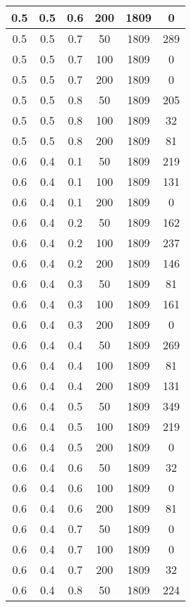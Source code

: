 \begin{center}
\begin{longtable}[c]{|c|c|c|c|c|c|}
		0.5 &  0.5 &  0.6 &  200 &  1809 &     0 \\
	   \hline
		0.5 &  0.5 &  0.7 &   50 &  1809 &   289 \\
		0.5 &  0.5 &  0.7 &  100 &  1809 &     0 \\
		0.5 &  0.5 &  0.7 &  200 &  1809 &     0 \\
	   \hline
		0.5 &  0.5 &  0.8 &   50 &  1809 &   205 \\
		0.5 &  0.5 &  0.8 &  100 &  1809 &    32 \\
		0.5 &  0.5 &  0.8 &  200 &  1809 &    81 \\
	   \hline
		0.6 &  0.4 &  0.1 &   50 &  1809 &   219 \\
		0.6 &  0.4 &  0.1 &  100 &  1809 &   131 \\
		0.6 &  0.4 &  0.1 &  200 &  1809 &     0 \\
	   \hline
		0.6 &  0.4 &  0.2 &   50 &  1809 &   162 \\
		0.6 &  0.4 &  0.2 &  100 &  1809 &   237 \\
		0.6 &  0.4 &  0.2 &  200 &  1809 &   146 \\
	   \hline
		0.6 &  0.4 &  0.3 &   50 &  1809 &    81 \\
		0.6 &  0.4 &  0.3 &  100 &  1809 &   161 \\
		0.6 &  0.4 &  0.3 &  200 &  1809 &     0 \\
	   \hline
		0.6 &  0.4 &  0.4 &   50 &  1809 &   269 \\
		0.6 &  0.4 &  0.4 &  100 &  1809 &    81 \\
		0.6 &  0.4 &  0.4 &  200 &  1809 &   131 \\
	   \hline
		0.6 &  0.4 &  0.5 &   50 &  1809 &   349 \\
		0.6 &  0.4 &  0.5 &  100 &  1809 &   219 \\
		0.6 &  0.4 &  0.5 &  200 &  1809 &     0 \\
	   \hline
		0.6 &  0.4 &  0.6 &   50 &  1809 &    32 \\
		0.6 &  0.4 &  0.6 &  100 &  1809 &     0 \\
		0.6 &  0.4 &  0.6 &  200 &  1809 &    81 \\
	   \hline
		0.6 &  0.4 &  0.7 &   50 &  1809 &     0 \\
		0.6 &  0.4 &  0.7 &  100 &  1809 &     0 \\
		0.6 &  0.4 &  0.7 &  200 &  1809 &    32 \\
	   \hline
		0.6 &  0.4 &  0.8 &   50 &  1809 &   224 \\

\end{longtable}
\end{center}
